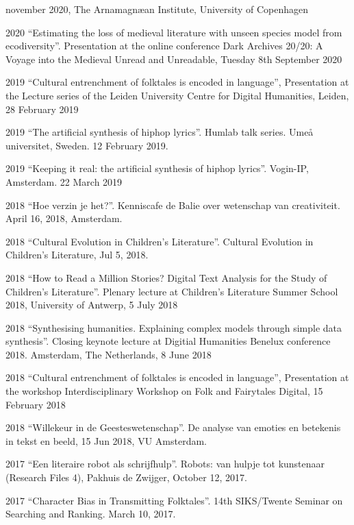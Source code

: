 \documentclass[12pt,letterpaper]{report}
\begin{document}
\begin{tablist}
    november 2020, The Arnamagnæan Institute, University of Copenhagen
\item[2020] \tab{}``Estimating the loss of medieval literature with unseen species model
    from ecodiversity''. Presentation at the online conference Dark Archives 20/20: A
    Voyage into the Medieval Unread and Unreadable, Tuesday 8th September 2020
\item[2019] \tab{}``Cultural entrenchment of folktales is encoded in language'',
  Presentation at the Lecture series of the Leiden University Centre for Digital
  Humanities, Leiden, 28 February 2019
\item[2019] \tab{}``The artificial synthesis of hiphop lyrics''. Humlab talk series. Umeå
  universitet, Sweden. 12 February 2019.
\item[2019] \tab{}``Keeping it real: the artificial synthesis of hiphop lyrics''. Vogin-IP,
  Amsterdam. 22 March 2019
\item[2018] \tab{}``Hoe verzin je het?''. Kenniscafe de Balie over wetenschap van
  creativiteit. April 16, 2018, Amsterdam. 
\item[2018] \tab{}``Cultural Evolution in Children’s Literature''. Cultural Evolution in
  Children's Literature, Jul 5, 2018. 
\item[2018] \tab{}``How to Read a Million Stories? Digital Text Analysis for the Study of
  Children's Literature''. Plenary lecture at Children’s Literature Summer School 2018,
  University of Antwerp, 5 July 2018
\item[2018] \tab{}``Synthesising humanities. Explaining complex models through simple data
  synthesis''. Closing keynote lecture at Digitial Humanities Benelux conference 2018.
  Amsterdam, The Netherlands, 8 June 2018
\item[2018] \tab{}``Cultural entrenchment of folktales is encoded in language'',
  Presentation at the workshop Interdisciplinary Workshop on Folk and Fairytales Digital,
  15 February 2018
\item[2018] \tab{}``Willekeur in de Geesteswetenschap''. De analyse van emoties en
  betekenis in tekst en beeld, 15 Jun 2018, VU Amsterdam.
\item[2017] \tab{}``Een literaire robot als schrijfhulp''. Robots: van hulpje tot
  kunstenaar (Research Files 4), Pakhuis de Zwijger, October 12, 2017. 
\item[2017] \tab{}``Character Bias in Transmitting Folktales''. 14th SIKS/Twente Seminar
  on Searching and Ranking. March 10, 2017. 
\end{tablist}
\end{document}
